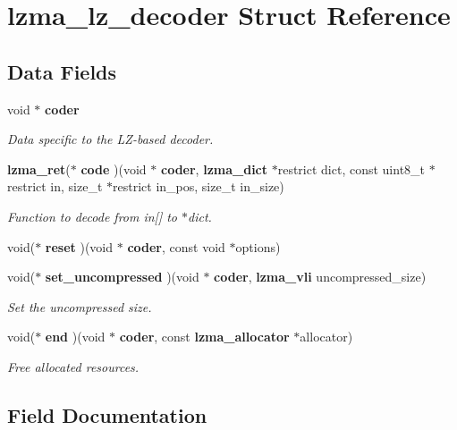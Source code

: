 \section{lzma\+\_\+lz\+\_\+decoder Struct Reference}
\label{structlzma__lz__decoder}
\subsection*{Data Fields}
\begin{DoxyCompactItemize}
\item 
void $\ast$ \textbf{ coder}
\begin{DoxyCompactList}\small\item\em Data specific to the L\+Z-\/based decoder. \end{DoxyCompactList}\item 
\textbf{ lzma\+\_\+ret}($\ast$ \textbf{ code} )(void $\ast$\textbf{ coder}, \textbf{ lzma\+\_\+dict} $\ast$restrict dict, const uint8\+\_\+t $\ast$restrict in, size\+\_\+t $\ast$restrict in\+\_\+pos, size\+\_\+t in\+\_\+size)
\begin{DoxyCompactList}\small\item\em Function to decode from in[] to $\ast$dict. \end{DoxyCompactList}\item 
\mbox{\label{structlzma__lz__decoder_af0770fd7569ff750f92a1fe70369bab1}} 
void($\ast$ {\bfseries reset} )(void $\ast$\textbf{ coder}, const void $\ast$options)
\item 
void($\ast$ \textbf{ set\+\_\+uncompressed} )(void $\ast$\textbf{ coder}, \textbf{ lzma\+\_\+vli} uncompressed\+\_\+size)
\begin{DoxyCompactList}\small\item\em Set the uncompressed size. \end{DoxyCompactList}\item 
void($\ast$ \textbf{ end} )(void $\ast$\textbf{ coder}, const \textbf{ lzma\+\_\+allocator} $\ast$allocator)
\begin{DoxyCompactList}\small\item\em Free allocated resources. \end{DoxyCompactList}\end{DoxyCompactItemize}


\subsection{Field Documentation}
\mbox{\label{structlzma__lz__decoder_a3c045dd51362e161dd7318ea3054a9fa}} 
